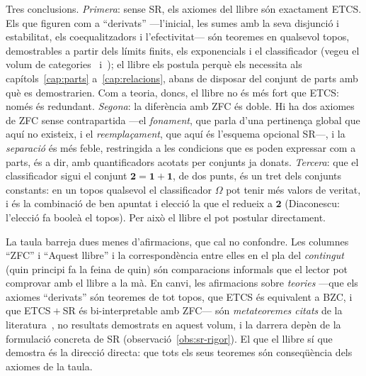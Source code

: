 \begin{observacio}\label{obs:lectura-taula}
Tres conclusions. \emph{Primera}: sense SR, els axiomes del llibre són
exactament ETCS. Els que figuren com a \enquote{derivats} ---l'inicial, les
sumes amb la seva disjunció i estabilitat, els coequalitzadors i
l'efectivitat--- són teoremes en qualsevol topos, demostrables a partir
dels límits finits, els exponencials i el classificador (vegeu el volum de
categories~\cite{perello-categories} i~\cite[cap.~IV]{maclane-moerdijk}); el
llibre els postula perquè els necessita als capítols~\ref{cap:parts}
a~\ref{cap:relacions}, abans de disposar del conjunt de parts amb què es
demostrarien. Com a teoria, doncs, el llibre no és més fort que ETCS:
només és redundant. \emph{Segona}: la diferència amb ZFC és doble. Hi ha
dos axiomes de ZFC sense contrapartida ---el \emph{fonament}, que parla
d'una pertinença global que aquí no existeix, i el \emph{reemplaçament},
que aquí és l'esquema opcional SR---, i la \emph{separació} és més feble,
restringida a les condicions que es poden expressar com a parts, és a dir,
amb quantificadors acotats per conjunts ja donats. \emph{Tercera}: que el
classificador sigui el conjunt \(\mathbf2=\mathbf1+\mathbf1\), de dos punts,
és un tret dels conjunts constants: en un topos qualsevol el classificador
\(\Omega\) pot tenir més valors de veritat, i és la combinació de ben
apuntat i elecció la que el redueix a \(\mathbf2\) (Diaconescu: l'elecció
fa booleà el topos). Per això el llibre el pot postular directament.
\end{observacio}

\begin{observacio}\label{obs:taula-citat}
La taula barreja dues menes d'afirmacions, que cal no confondre. Les
columnes \enquote{ZFC} i \enquote{Aquest llibre} i la correspondència entre
elles en el pla del \emph{contingut} (quin principi fa la feina de quin) són
comparacions informals que el lector pot comprovar amb el llibre a la mà.
En canvi, les afirmacions sobre \emph{teories} ---que els axiomes
\enquote{derivats} són teoremes de tot topos, que ETCS és equivalent a BZC, i
que ETCS\({}+{}\)SR és bi-interpretable amb ZFC--- són \emph{metateoremes
citats} de la literatura~\cite{osius1974,mclarty-catset,shulman-comparing,maclane-moerdijk},
no resultats demostrats en aquest volum, i la darrera depèn de la
formulació concreta de SR (observació~\ref{obs:sr-rigor}). El que el llibre
sí que demostra és la direcció directa: que tots els seus teoremes són
conseqüència dels axiomes de la taula.
\end{observacio}

